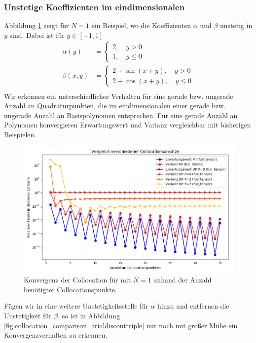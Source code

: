 \subsubsection*{Unstetige Koeffizienten im eindimensionalen}
Abbildung \ref{fig:collocation_comparison_trialdiscontsimple} zeigt für $N=1$ ein Beispiel, wo die Koeffizienten $\alpha$ und $\beta$ unstetig in $y$ sind. Dabei ist für $y\in[-1,1]$
\begin{align*}
\alpha(y)&=\begin{cases}2,\quad y>0\\ 1, \quad y\le 0\end{cases}\\
\beta(x,y)&=\begin{cases}2+\sin(x+y),\quad y>0\\ 2+\cos(x+y),\quad y\le 0\end{cases}\\
\end{align*}
Wir erkennen ein unterschiedliches Verhalten für eine gerade bzw. ungerade Anzahl an Quadraturpunkten, die im eindimensionalen einer gerade bzw. ungerade Anzahl an Basispolynomen entsprechen. Für eine gerade Anzahl an Polynomen konvergieren Erwartungswert und Varianz vergleichbar mit bisherigen Beispielen.
\begin{figure}[!htb]
\includegraphics[width=\textwidth]{Figures/collocation_midp_trialdiscontsimple.png}
\caption{Konvergenz der Collocation für  mit $N=1$ anhand der Anzahl benötigter Collocationspunkte.}
\label{fig:collocation_comparison_trialdiscontsimple}
\end{figure}
Fügen wir in  eine weitere Unstetigkeitsstelle für $\alpha$ hinzu und entfernen die Unstetigkeit für $\beta$, so ist in Abbildung \ref{fig:collocation_comparison_trialdisconttriple} nur noch mit großer Mühe ein Konvergenzverhalten zu erkennen.

